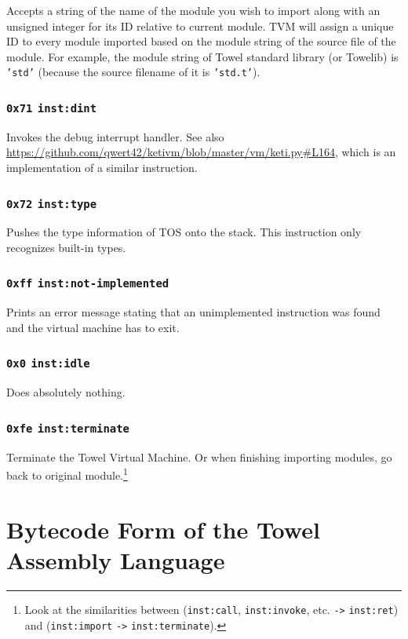 \documentclass{article}
\newcommand{\inst}[1] {\texttt{inst:#1}}
\begin{document}
Accepts a string of the name of the module you wish to import along with an unsigned integer for its ID relative to current module. TVM will assign a unique ID to every module imported based on the module string of the source file of the module. For example, the module string of Towel standard library (or Towelib) is \texttt{'std'} (because the source filename of it is \texttt{'std.t'}).

\subsubsection{\texttt{0x71} \inst{dint}}

Invokes the debug interrupt handler. See also \url{https://github.com/qwert42/ketivm/blob/master/vm/keti.py#L164}, which is an implementation of a similar instruction.

\subsubsection{\texttt{0x72} \inst{type}}

Pushes the type information of TOS onto the stack. This instruction only recognizes built-in types.

\subsubsection{\texttt{0xff} \inst{not-implemented}}

Prints an error message stating that an unimplemented instruction was found and the virtual machine has to exit.

\subsubsection{\texttt{0x0} \inst{idle}}

Does absolutely nothing.

\subsubsection{\texttt{0xfe} \inst{terminate}}

Terminate the Towel Virtual Machine. Or when finishing importing modules, go back to original module.\footnote{Look at the similarities between (\inst{call}, \inst{invoke}, etc. \texttt{->} \inst{ret}) and (\inst{import} \texttt{->} \inst{terminate}).}

\section{Bytecode Form of the Towel Assembly Language}
\end{document}
